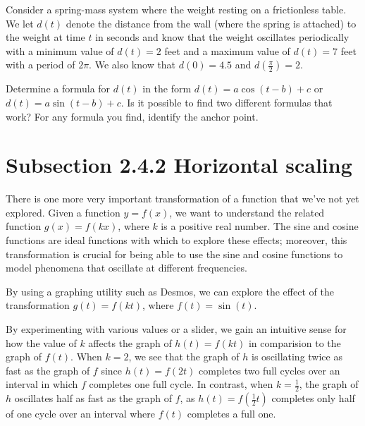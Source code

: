 \documentclass{ximera}
\begin{document}
\begin{exploration}
Consider a spring-mass system where the weight resting on a frictionless table.  We let \(d(t)\) denote the distance from the wall (where the spring is attached) to the weight at time \(t\) in seconds and know that the weight oscillates periodically with a minimum value of \(d(t) = 2\) feet and a maximum value of \(d(t) = 7\) feet with a period of \(2 \pi\).  We also know that \(d(0) = 4.5\) and \(d\left(\frac{\pi}{2}\right) = 2\).%

Determine a formula for \(d(t)\) in the form \(d(t) = a\cos(t-b)+c\) or \(d(t) = a\sin(t-b)+c\).  Is it possible to find two different formulas that work?  For any formula you find, identify the anchor point.%
\end{exploration}
%
%
%

\section{Subsection 2.4.2 Horizontal scaling}

There is one more very important transformation of a function that we've not yet explored.  Given a function \(y = f(x)\), we want to understand the related function \(g(x) = f(kx)\), where \(k\) is a positive real number.  The sine and cosine functions are ideal functions with which to explore these effects; moreover, this transformation is crucial for being able to use the sine and cosine functions to model phenomena that oscillate at different frequencies.%

By using a graphing utility such as Desmos, we can explore the effect of the transformation \(g(t) = f(kt)\), where \(f(t) = \sin(t)\).%

By experimenting with various values or a slider, we gain an intuitive sense for how the value of \(k\) affects the graph of \(h(t) = f(kt)\) in comparision to the graph of \(f(t)\).  When \(k = 2\), we see that the graph of \(h\) is oscillating twice as fast as the graph of \(f\) since \(h(t) = f(2t)\) completes two full cycles over an interval in which \(f\) completes one full cycle.  In contrast, when \(k = \frac{1}{2}\), the graph of \(h\) oscillates half as fast as the graph of \(f\), as \(h(t) = f(\frac{1}{2}t)\) completes only half of one cycle over an interval where \(f(t)\) completes a full one.%
\end{document}
